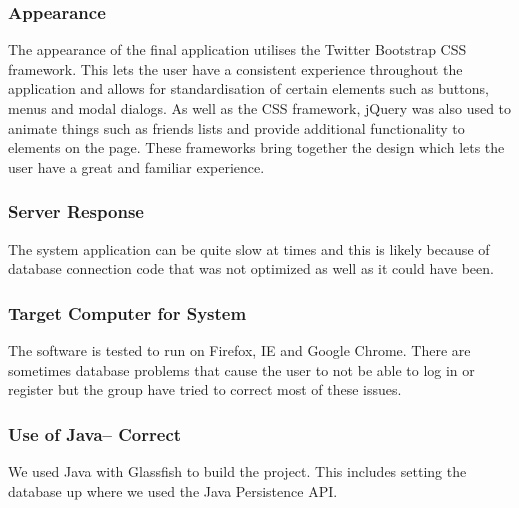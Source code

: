 \documentclass[titlepage]{article}
\begin{document}
{\subsubsection{Appearance}
The appearance of the final application utilises the Twitter Bootstrap CSS framework. This lets the user have a consistent experience throughout the application and allows for standardisation of certain elements such as buttons, menus and modal dialogs. As well as the CSS framework, jQuery was also used to animate things such as friends lists and provide additional functionality to elements on the page. These frameworks bring together the design which lets the user have a great and familiar experience.

\subsubsection{Server Response}
The system application can be quite slow at times and this is likely because of database connection code that was not optimized as well as it could have been.

\subsubsection{Target Computer for System}
The software is tested to run on Firefox, IE and Google Chrome. There are sometimes database problems that cause the user to not be able to log in or register but the group have tried to correct most of these issues.

\subsubsection{Use of Java– Correct}
We used Java with Glassfish to build the project. This includes setting the database up where we used the Java Persistence API. 

}
\end{document}

